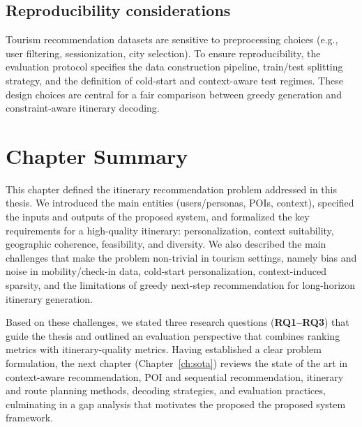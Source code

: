 \subsection{Reproducibility considerations}
Tourism recommendation datasets are sensitive to preprocessing choices (e.g., user filtering, sessionization, city selection). To ensure reproducibility, the evaluation protocol specifies the data construction pipeline, train/test splitting strategy, and the definition of cold-start and context-aware test regimes. These design choices are central for a fair comparison between greedy generation and constraint-aware itinerary decoding.

\section{Chapter Summary}
\label{sec:prob-summary}

This chapter defined the itinerary recommendation problem addressed in this thesis. We introduced the main entities (users/personas, POIs, context), specified the inputs and outputs of the proposed system, and formalized the key requirements for a high-quality itinerary: personalization, context suitability, geographic coherence, feasibility, and diversity. We also described the main challenges that make the problem non-trivial in tourism settings, namely bias and noise in mobility/check-in data, cold-start personalization, context-induced sparsity, and the limitations of greedy next-step recommendation for long-horizon itinerary generation.

Based on these challenges, we stated three research questions (\textbf{RQ1--RQ3}) that guide the thesis and outlined an evaluation perspective that combines ranking metrics with itinerary-quality metrics. Having established a clear problem formulation, the next chapter (Chapter~\ref{ch:sota}) reviews the state of the art in context-aware recommendation, POI and sequential recommendation, itinerary and route planning methods, decoding strategies, and evaluation practices, culminating in a gap analysis that motivates the proposed the proposed system framework.
